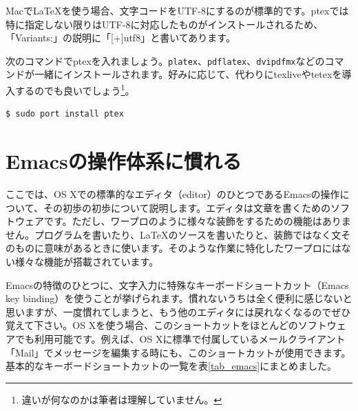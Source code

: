 Macで\LaTeX{}を使う場合、文字コードをUTF-8にするのが標準的です。ptexでは特に指定しない限りはUTF-8に対応したものがインストールされるため、「Variants:」の説明に「[+]utf8」と書いてあります。

次のコマンドでptexを入れましょう。\texttt{platex}、\texttt{pdflatex}、\texttt{dvipdfmx}などのコマンドが一緒にインストールされます。好みに応じて、代わりにtexliveやtetexを導入するのでも良いでしょう\footnote{違いが何なのかは筆者は理解していません。}。

\begin{lstlisting}[language=bash]
$ sudo port install ptex
\end{lstlisting}

\section{Emacsの操作体系に慣れる}
\label{sec_Emacs}

ここでは、OS Xでの標準的なエディタ（editor）のひとつであるEmacsの操作について、その初歩の初歩について説明します。エディタは文章を書くためのソフトウェアです。ただし、ワープロのように様々な装飾をするための機能はありません。プログラムを書いたり、\LaTeX{}のソースを書いたりと、装飾ではなく文そのものに意味があるときに使います。そのような作業に特化したワープロにはない様々な機能が搭載されています。

Emacsの特徴のひとつに、文字入力に特殊なキーボードショートカット（Emacs key binding）を使うことが挙げられます。慣れないうちは全く便利に感じないと思いますが、一度慣れてしまうと、もう他のエディタには戻れなくなるのでぜひ覚えて下さい。OS Xを使う場合、このショートカットをほとんどのソフトウェアでも利用可能です。例えば、OS Xに標準で付属しているメールクライアント「Mail」でメッセージを編集する時にも、このショートカットが使用できます。基本的なキーボードショートカットの一覧を表\ref{tab_emacs}にまとめました。

